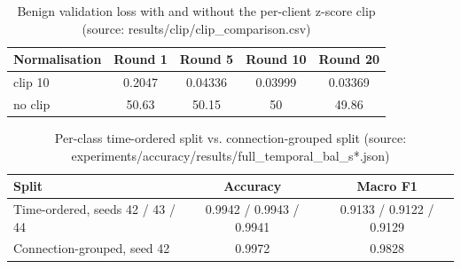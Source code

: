 \begin{table}[H]
\centering
\scriptsize
\setlength{\tabcolsep}{3pt}
\renewcommand{\arraystretch}{1.15}
\begin{tabular}{|l|c|c|c|c|}
\hline
\textbf{Normalisation} & \textbf{Round 1} & \textbf{Round 5} & \textbf{Round 10} & \textbf{Round 20} \\ \hline
clip 10 & 0.2047 & 0.04336 & 0.03999 & 0.03369 \\ \hline
no clip & 50.63 & 50.15 & 50 & 49.86 \\ \hline
\end{tabular}
\caption{Benign validation loss with and without the per-client z-score clip (source: results/clip/clip\_comparison.csv)}
\label{tab:fu_clip}
\end{table}

\begin{table}[H]
\centering
\small
\setlength{\tabcolsep}{3pt}
\renewcommand{\arraystretch}{1.15}
\begin{tabular}{|l|c|c|}
\hline
\textbf{Split} & \textbf{Accuracy} & \textbf{Macro F1} \\ \hline
Time-ordered, seeds 42 / 43 / 44 & 0.9942 / 0.9943 / 0.9941 & 0.9133 / 0.9122 / 0.9129 \\ \hline
Connection-grouped, seed 42 & 0.9972 & 0.9828 \\ \hline
\end{tabular}
\caption{Per-class time-ordered split vs. connection-grouped split (source: experiments/accuracy/results/full\_temporal\_bal\_s*.json)}
\label{tab:fu_temporal_summary}
\end{table}

